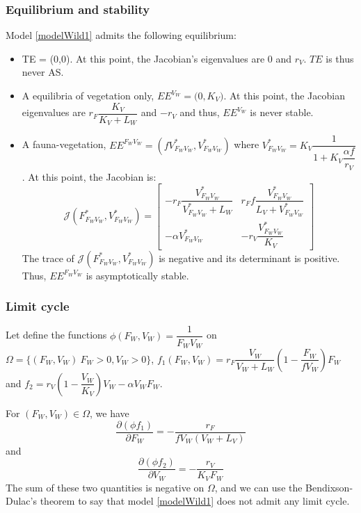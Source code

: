 \documentclass{article}
\begin{document}
\subsubsection{Equilibrium and stability}
Model \eqref{modelWild1} admits the following equilibrium:
\begin{itemize}
\item TE = (0,0). At this point, the Jacobian's eigenvalues are $0$ and $r_V$. $TE$ is thus never AS.
\item A equilibria of vegetation only, $EE^{V_W} = \Big(0, K_V\Big)$. At this point, the Jacobian eigenvalues are $r_F \dfrac{K_V}{K_V + L_W}$ and $-r_V$ and thus, $EE^{V_W}$ is never stable.
\item A fauna-vegetation, $EE^{F_WV_W} = \left(fV^*_{F_WV_W}, V^*_{F_WV_W} \right)$ where $V^*_{F_WV_W} = K_V \dfrac{1}{1+K_V\dfrac{\alpha f}{r_V}}$. At this point, the Jacobian is:
\begin{equation}
\mathcal{J}(F_{F_WV_W}^*, V_{F_WV_W}^*) = \begin{bmatrix}
-r_F \dfrac{V_{F_WV_W}^*}{V_{F_WV_W}^* +L_W}  & r_F f \dfrac{V_{F_WV_W}^*}{L_V + V_{F_WV_W}^*}\\
- \alpha V_{F_WV_W}^* & -r_V \dfrac{V_{F_WV_W}^*}{K_V}
\end{bmatrix}
\end{equation}
The trace of $\mathcal{J}(F_{F_WV_W}^*, V_{F_WV_W}^*)$ is negative and its determinant is positive. Thus, $EE^{F_WV_W}$ is asymptotically stable.
\end{itemize}

\subsubsection{Limit cycle}
Let define the functions $\phi(F_W, V_W) = \dfrac{1}{F_W V_W}$ on $ \Omega = \{(F_W, V_W) \ F_W > 0, V_W > 0\}$, $f_1(F_W, V_W) = r_F \dfrac{V_W}{V_W + L_W} \left(1 - \dfrac{F_W}{f V_W}\right) F_W$ and $f_2 = r_V \left(1 - \dfrac{V_W}{K_V}\right) V_W - \alpha V_W F_W$.

For $(F_W, V_W) \in \Omega$, we have
\begin{equation}
\dfrac{\partial (\phi f_1)}{\partial F_W} = - \dfrac{r_F}{fV_W (V_W + L_V)}
\end{equation}
and
\begin{equation}
\dfrac{\partial (\phi f_2)}{\partial V_W} = - \dfrac{r_V}{K_V F_W}
\end{equation}
The sum of these two quantities is negative on $\Omega$, and we can use the Bendixson-Dulac's theorem to say that model \eqref{modelWild1} does not admit any limit cycle.
\end{document}
